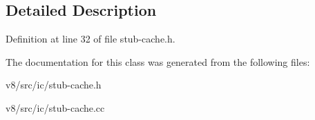 \subsection{Detailed Description}


Definition at line 32 of file stub-\/cache.\+h.



The documentation for this class was generated from the following files\+:\begin{DoxyCompactItemize}
\item 
v8/src/ic/stub-\/cache.\+h\item 
v8/src/ic/stub-\/cache.\+cc\end{DoxyCompactItemize}
